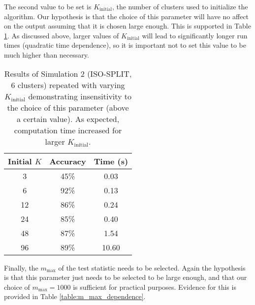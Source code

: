\documentclass[10pt]{article}
\begin{document}
The second value to be set is $K_{\text{initial}}$, the number of clusters used to initialize the algorithm. Our hypothesis is that the choice of this parameter will have no affect on the output assuming that it is chosen large enough. This is supported in Table \ref{table:initial_K_dependence}. As discussed above, larger values of $K_{\text{initial}}$ will lead to significantly longer run times (quadratic time dependence), so it is important not to set this value to be much higher than necessary. 

\begin{table}[t]
  \centering
\begin{tabular}{c|c|c|}
	\textbf{Initial $K$} & \textbf{Accuracy} & \textbf{Time (s)} \\
	\hline
	3 & 45\% & 0.03 \\
6 & 92\% & 0.13 \\
12 & 86\% & 0.24 \\
24 & 85\% & 0.40 \\
48 & 87\% & 1.54 \\
96 & 89\% & 10.60 \\
\end{tabular}
\caption{
\label{table:initial_K_dependence}
Results of Simulation 2 (ISO-SPLIT, 6 clusters) repeated with varying $K_\text{initial}$ demonstrating insensitivity to the choice of this parameter (above a certain value). As expected, computation time increased for larger $K_\text{initial}$.
}
\end{table}

Finally, the $m_\text{max}$ of the test statistic needs to be selected. Again the hypothesis is that this parameter just needs to be selected to be large enough, and that our choice of $m_\text{max}=1000$ is sufficient for practical purposes. Evidence for this is provided in Table \ref{table:m_max_dependence}.
\end{document}

